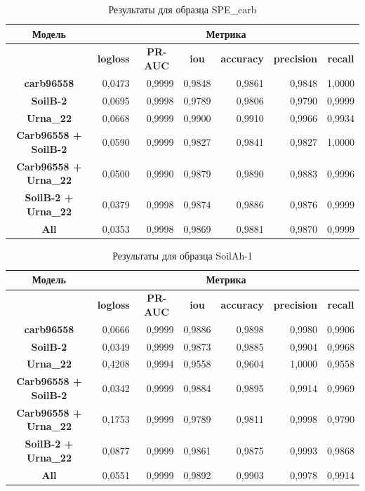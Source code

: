 \documentclass[14pt, a4paper, oneside, bold]{extarticle}
\begin{document}
\begin{table}[htbp]
\small
\begin{tabular}{|c|r|r|r|r|r|r|}
\hline
\textbf{Модель} & \multicolumn{ 6}{c|}{\textbf{Метрика}} \\ \hline
\textbf{} & \multicolumn{1}{c|}{\textbf{logloss}} & \multicolumn{1}{c|}{\textbf{PR-AUC}} & \multicolumn{1}{c|}{\textbf{iou}} & \multicolumn{1}{c|}{\textbf{accuracy}} & \multicolumn{1}{c|}{\textbf{precision}} & \multicolumn{1}{c|}{\textbf{recall}} \\ \hline
\textbf{carb96558} & 0,0473 & 0,9999 & 0,9848 & 0,9861 & 0,9848 & 1,0000 \\ \hline
\textbf{SoilB-2} & 0,0695 & 0,9998 & 0,9789 & 0,9806 & 0,9790 & 0,9999 \\ \hline
\textbf{Urna\_22} & 0,0668 & 0,9999 & 0,9900 & 0,9910 & 0,9966 & 0,9934 \\ \hline
\textbf{Carb96558 + SoilB-2} & 0,0590 & 0,9999 & 0,9827 & 0,9841 & 0,9827 & 1,0000 \\ \hline
\textbf{Carb96558 + Urna\_22} & 0,0500 & 0,9990 & 0,9879 & 0,9890 & 0,9883 & 0,9996 \\ \hline
\textbf{SoilB-2 + Urna\_22} & 0,0379 & 0,9998 & 0,9874 & 0,9886 & 0,9876 & 0,9999 \\ \hline
\textbf{All} & 0,0353 & 0,9998 & 0,9869 & 0,9881 & 0,9870 & 0,9999 \\ \hline
\end{tabular}
\caption{Результаты для образца SPE\_carb}
\label{SPE_carb}
\end{table}


\begin{table}[htbp]
\small
\begin{tabular}{|c|r|r|r|r|r|r|}
\hline
\textbf{Модель} & \multicolumn{ 6}{c|}{\textbf{Метрика}} \\ \hline
\textbf{} & \multicolumn{1}{c|}{\textbf{logloss}} & \multicolumn{1}{c|}{\textbf{PR-AUC}} & \multicolumn{1}{c|}{\textbf{iou}} & \multicolumn{1}{c|}{\textbf{accuracy}} & \multicolumn{1}{c|}{\textbf{precision}} & \multicolumn{1}{c|}{\textbf{recall}} \\ \hline
\textbf{carb96558} & 0,0666 & 0,9999 & 0,9886 & 0,9898 & 0,9980 & 0,9906 \\ \hline
\textbf{SoilB-2} & 0,0349 & 0,9999 & 0,9873 & 0,9885 & 0,9904 & 0,9968 \\ \hline
\textbf{Urna\_22} & 0,4208 & 0,9994 & 0,9558 & 0,9604 & 1,0000 & 0,9558 \\ \hline
\textbf{Carb96558 + SoilB-2} & 0,0342 & 0,9999 & 0,9884 & 0,9895 & 0,9914 & 0,9969 \\ \hline
\textbf{Carb96558 + Urna\_22} & 0,1753 & 0,9999 & 0,9789 & 0,9811 & 0,9998 & 0,9790 \\ \hline
\textbf{SoilB-2 + Urna\_22} & 0,0877 & 0,9999 & 0,9861 & 0,9875 & 0,9993 & 0,9868 \\ \hline
\textbf{All} & 0,0551 & 0,9999 & 0,9892 & 0,9903 & 0,9978 & 0,9914 \\ \hline
\end{tabular}
\caption{Результаты для образца SoilAh-1}
\label{SoilAh-1}
\end{table}
\end{document}
